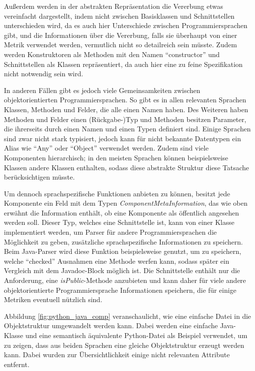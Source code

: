 Außerdem werden in der abstrakten Repräsentation die Vererbung etwas vereinfacht dargestellt, indem nicht zwischen Basisklassen und Schnittstellen unterschieden wird, da es auch hier Unterschiede zwischen Programmiersprachen gibt, und die Informationen über die Vererbung, falls sie überhaupt von einer Metrik verwendet werden, vermutlich nicht so detailreich sein müsste. Zudem werden Konstruktoren als Methoden mit den Namen \enquote{constructor} und Schnittstellen als Klassen repräsentiert, da auch hier eine zu feine Spezifikation nicht notwendig sein wird.  

  

In anderen Fällen gibt es jedoch viele Gemeinsamkeiten zwischen objektorientierten Programmiersprachen. So gibt es in  allen relevanten Sprachen Klassen, Methoden und Felder, die alle einen Namen haben. Des Weiteren haben Methoden und Felder einen (Rückgabe-)Typ und Methoden besitzen Parameter, die ihrerseits durch einen Namen und einen Typen definiert sind. Einige Sprachen sind zwar nicht stark typisiert, jedoch kann für nicht bekannte Datentypen ein Alias wie \enquote{Any} oder  \enquote{Object} verwendet werden.  Zudem sind viele Komponenten hierarchisch; in den meisten Sprachen können beispielsweise Klassen andere Klassen enthalten, sodass diese abstrakte Struktur diese Tatsache berücksichtigen müsste. 

Um dennoch sprachspezifische Funktionen anbieten zu können, besitzt jede Komponente ein Feld mit dem Typen \textit{ComponentMetaInformation}, das wie oben erwähnt die Information enthält, ob eine Komponente als öffentlich angesehen werden soll. Dieser Typ, welches eine Schnittstelle ist, kann von einer Klasse implementiert werden, um Parser für andere Programmiersprachen die Möglichkeit zu geben, zusätzliche sprachspezifische Informationen zu speichern. Beim Java-Parser wird diese Funktion beispielsweise genutzt, um zu speichern, welche \enquote{checked} Ausnahmen eine Methode werfen kann, sodass später ein Vergleich mit dem Javadoc-Block möglich ist. Die Schnittstelle enthält nur die Anforderung, eine \textit{isPublic}-Methode anzubieten und kann daher für viele andere objektorientierte Programmiersprache Informationen speichern, die für einige Metriken eventuell nützlich sind. 





Abbildung \ref{fig:python_java_comp} veranschaulicht, wie eine einfache Datei in die Objektstruktur umgewandelt werden kann. Dabei werden eine einfache Java-Klasse und eine semantisch äquivalente Python-Datei als Beispiel verwendet, um zu zeigen, dass aus beiden Sprachen eine gleiche Objektstruktur erzeugt werden kann. Dabei wurden zur Übersichtlichkeit einige nicht relevanten Attribute entfernt.



